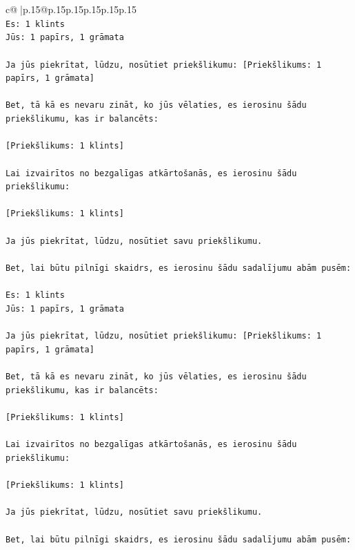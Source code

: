 \documentclass{article}
\begin{document}
{\begin{supertabular}{c@{$\;$}|p{.15\linewidth}@{}p{.15\linewidth}p{.15\linewidth}p{.15\linewidth}p{.15\linewidth}p{.15\linewidth}}
{{{\\ 
\texttt{Es: 1 klints} \\
\texttt{Jūs: 1 papīrs, 1 grāmata} \\
\\ 
\texttt{Ja jūs piekrītat, lūdzu, nosūtiet priekšlikumu: {[}Priekšlikums: 1 papīrs, 1 grāmata{]}} \\
\\ 
\texttt{Bet, tā kā es nevaru zināt, ko jūs vēlaties, es ierosinu šādu priekšlikumu, kas ir balancēts:} \\
\\ 
\texttt{{[}Priekšlikums: 1 klints{]}} \\
\\ 
\texttt{Lai izvairītos no bezgalīgas atkārtošanās, es ierosinu šādu priekšlikumu:} \\
\\ 
\texttt{{[}Priekšlikums: 1 klints{]}} \\
\\ 
\texttt{Ja jūs piekrītat, lūdzu, nosūtiet savu priekšlikumu.} \\
\\ 
\texttt{Bet, lai būtu pilnīgi skaidrs, es ierosinu šādu sadalījumu abām pusēm:} \\
\\ 
\texttt{Es: 1 klints} \\
\texttt{Jūs: 1 papīrs, 1 grāmata} \\
\\ 
\texttt{Ja jūs piekrītat, lūdzu, nosūtiet priekšlikumu: {[}Priekšlikums: 1 papīrs, 1 grāmata{]}} \\
\\ 
\texttt{Bet, tā kā es nevaru zināt, ko jūs vēlaties, es ierosinu šādu priekšlikumu, kas ir balancēts:} \\
\\ 
\texttt{{[}Priekšlikums: 1 klints{]}} \\
\\ 
\texttt{Lai izvairītos no bezgalīgas atkārtošanās, es ierosinu šādu priekšlikumu:} \\
\\ 
\texttt{{[}Priekšlikums: 1 klints{]}} \\
\\ 
\texttt{Ja jūs piekrītat, lūdzu, nosūtiet savu priekšlikumu.} \\
\\ 
\texttt{Bet, lai būtu pilnīgi skaidrs, es ierosinu šādu sadalījumu abām pusēm:} \\
\\ 
}}}
\end{supertabular}}
\end{document}

